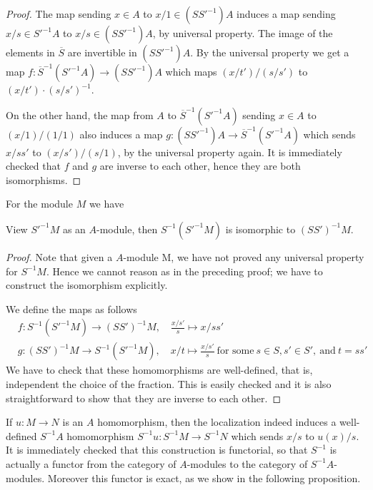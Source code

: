 \begin{proof}
The map sending $x\in A$ to $x/1\in (SS'^{-1})A$ induces a map
sending $x/s\in S'^{-1}A$ to $x/s \in (SS'^{-1})A$, by universal
property. The image of the elements in $\overline{S}$ are invertible
in $(SS'^{-1})A$. By the universal property we get a map
$f : \overline{S}^{-1}(S'^{-1}A)\rightarrow (SS'^{-1})A$ which maps
$(x/t')/(s/s')$ to $(x/t')\cdot(s/s')^{-1}$.

\medskip\noindent
On the other hand, the map from $A$ to $\overline{S}^{-1}(S'^{-1}A)$
sending $x\in A$ to $(x/1)/(1/1)$ also induces a map
$g : (SS'^{-1})A\rightarrow \overline{S}^{-1}(S'^{-1}A)$ which sends $x/ss'$
to $(x/s')/(s/1)$, by the universal property again. It is
immediately checked that $f$ and $g$ are inverse to each other,
hence they are both isomorphisms.
\end{proof}

\noindent
For the module $M$ we have

\begin{proposition}
\label{proposition-localize-twice-module}
View $S'^{-1}M$ as an $A$-module, then $S^{-1}(S'^{-1}M)$ is
isomorphic to $(SS')^{-1}M$.
\end{proposition}

\begin{proof}
Note that given a $A$-module M, we have not proved any
universal property for $S^{-1}M$. Hence we cannot reason
as in the preceding proof; we have to construct the isomorphism explicitly.

\medskip\noindent
We define the maps as follows
\begin{align*}
&f : S^{-1}(S'^{-1}M) \longrightarrow (SS')^{-1}M, \quad \frac{x/s'}{s}\mapsto
x/ss'\\
&g : (SS')^{-1}M \longrightarrow S^{-1}(S'^{-1}M), \quad x/t\mapsto
\frac{x/s'}{s}\ \text{for some}\ s\in S, s'\in S', \ \text{and}\ 
t = ss'
\end{align*}
We have to check that these homomorphisms are well-defined, that is,
independent the choice of the fraction. This is easily checked and it is also
straightforward to show that they are inverse to each other.
\end{proof}

\noindent
If $u : M\rightarrow N$ is an $A$ homomorphism, then the localization indeed
induces a well-defined $S^{-1}A$ homomorphism $S^{-1}u : S^{-1}M\rightarrow
S^{-1}N$ which sends $x/s$ to $u(x)/s$. It is immediately checked that
this construction is functorial, so that $S^{-1}$
is actually a functor from the category of $A$-modules to the
category of $S^{-1}A$-modules. Moreover this functor is exact,
as we show in the following proposition.

